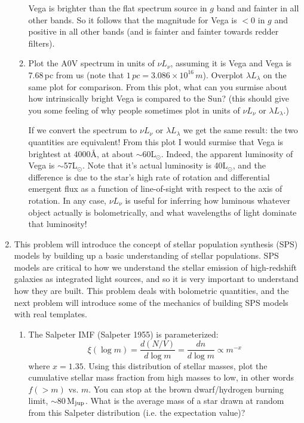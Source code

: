 \documentclass[11pt]{article}
\begin{document}
\begin{enumerate}
\begin{enumerate}
{\color{gray} Vega is brighter than the flat spectrum source in $g$
  band and fainter in all other bands.  So it follows that the
  magnitude for Vega is $<$0 in $g$ and positive in all other bands
  (and is fainter and fainter towards redder filters).}

      \item Plot the A0V spectrum in units of $\nu\!L_{\nu}$, assuming
        it is Vega and Vega is 7.68\,pc from us (note that
        $1\,pc=3.086\times10^{16}\,m$).  Overplot
        $\lambda\!L_{\lambda}$ on the same plot for comparison.  From
        this plot, what can you surmise about how intrinsically bright
        Vega is compared to the Sun? (this should give you some
        feeling of why people sometimes plot in units of
        $\nu\!L_{\nu}$ or $\lambda\!L_\lambda$.)

{\color{gray} If we convert the spectrum to $\nu L_\nu$ or $\lambda
  L_\lambda$ we get the same result: the two quantities are
  equivalent!  From this plot I would surmise that Vega is brightest
  at 4000\AA, at about $\sim$60L$_\odot$.  Indeed, the apparent
  luminosity of Vega is $\sim$57L$_\odot$. Note that it's actual
  luminosity is 40L$_\odot$, and the difference is due to the star's
  high rate of rotation and differential emergent flux as a function
  of line-of-sight with respect to the axis of rotation.  In any case,
  $\nu L_\nu$ is useful for inferring how luminous whatever object
  actually is bolometrically, and what wavelengths of light dominate
  that luminosity!}

\begin{figure}[h!]
\centering
\end{figure}


  \end{enumerate}

\item This problem will introduce the concept of stellar population
  synthesis (SPS) models by building up a basic understanding of
  stellar populations.  SPS models are critical to how we understand
  the stellar emission of high-redshift galaxies as integrated light
  sources, and so it is very important to understand how they are
  built.  This problem deals with bolometric quantities, and the next
  problem will introduce some of the mechanics of building SPS models
  with real templates.
  \begin{enumerate}
    \item The Salpeter IMF (Salpeter 1955) is parameterized:
      \begin{equation}
        \xi(\log\!m) = \frac{d(N/V)}{d\log\!m} = \frac{dn}{d\log\!m}\propto\!m^{-x}
      \end{equation}
      where $x=1.35$.  Using this distribution of stellar masses, plot
      the cumulative stellar mass fraction from high masses to low, in
      other words $f(>\!m)$ vs. $m$.  You can stop at the brown
      dwarf/hydrogen burning limit, $\sim$80\,M$_{\rm jup}$.  What is
      the average mass of a star drawn at random from this Salpeter
      distribution (i.e. the expectation value)?


\end{enumerate}
\end{enumerate}
\end{document}
